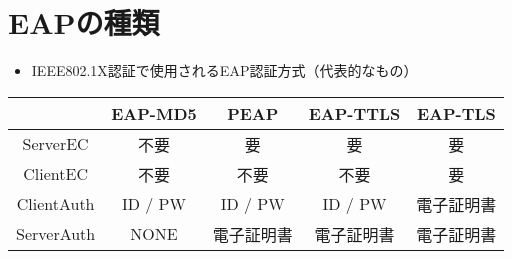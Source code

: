 \section{EAPの種類}
\toc
\begin{frame}[t]{\fft}
    \begin{itemize}
        \item IEEE802.1X認証で使用されるEAP認証方式（代表的なもの）
    \end{itemize}
    \begin{table}
        \centering
        \renewcommand{\arraystretch}{1.5}
        \begin{tabularx}{\textwidth}{cCCCC}
                                     & {\scriptsize EAP-MD5} & {\scriptsize PEAP} & {\scriptsize EAP-TTLS} & {\scriptsize EAP-TLS} \\
            \hline
            ServerEC\footnotemark[1] & 不要                    & 要                  & 要                      & 要                     \\
            ClientEC\footnotemark[1] & 不要                    & 不要                 & 不要                     & 要                     \\
            ClientAuth               & ID / PW               & ID / PW            & ID / PW                & 電子証明書                 \\
            ServerAuth               & NONE                  & 電子証明書              & 電子証明書                  & 電子証明書                 \\
            \hline
        \end{tabularx}
    \end{table}
\end{frame}